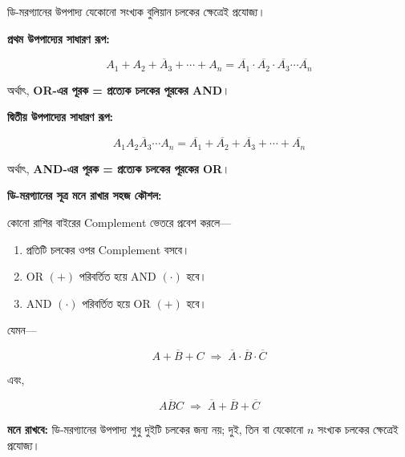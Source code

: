 ডি-মরগ্যানের উপপাদ্য যেকোনো সংখ্যক বুলিয়ান চলকের
ক্ষেত্রেই প্রযোজ্য।

\textbf{\textcolor{ICTOrange}{প্রথম উপপাদ্যের সাধারণ রূপ:}}

\[
\boxed{
\overline{
A_1+A_2+A_3+\cdots+A_n
}
=
\overline{A_1}\cdot
\overline{A_2}\cdot
\overline{A_3}\cdots
\overline{A_n}
}
\]

অর্থাৎ,
\textbf{\textenglish{OR}-এর পূরক =
প্রত্যেক চলকের পূরকের \textenglish{AND}}।

\textbf{\textcolor{ICTOrange}{দ্বিতীয় উপপাদ্যের সাধারণ রূপ:}}

\[
\boxed{
\overline{
A_1A_2A_3\cdots A_n
}
=
\overline{A_1}
+
\overline{A_2}
+
\overline{A_3}
+\cdots+
\overline{A_n}
}
\]

অর্থাৎ,
\textbf{\textenglish{AND}-এর পূরক =
প্রত্যেক চলকের পূরকের \textenglish{OR}}।


\par\begingroup

\textbf{ডি-মরগ্যানের সূত্র মনে রাখার সহজ কৌশল:}

কোনো রাশির বাইরের \textenglish{Complement}
ভেতরে প্রবেশ করলে—

\begin{enumerate}[leftmargin=*,itemsep=1pt]
    \item প্রতিটি চলকের ওপর \textenglish{Complement} বসবে।
    \item \textenglish{OR} \((+)\) পরিবর্তিত হয়ে
    \textenglish{AND} \((\cdot)\) হবে।
    \item \textenglish{AND} \((\cdot)\) পরিবর্তিত হয়ে
    \textenglish{OR} \((+)\) হবে।
\end{enumerate}

যেমন—

\[
\overline{A+B+C}
\;\Rightarrow\;
\overline{A}\cdot
\overline{B}\cdot
\overline{C}
\]

এবং,

\[
\overline{ABC}
\;\Rightarrow\;
\overline{A}+
\overline{B}+
\overline{C}
\]

\textbf{মনে রাখবে:}
ডি-মরগ্যানের উপপাদ্য শুধু দুইটি চলকের জন্য নয়;
দুই, তিন বা যেকোনো \(n\) সংখ্যক চলকের ক্ষেত্রেই প্রযোজ্য।
\par\endgroup



